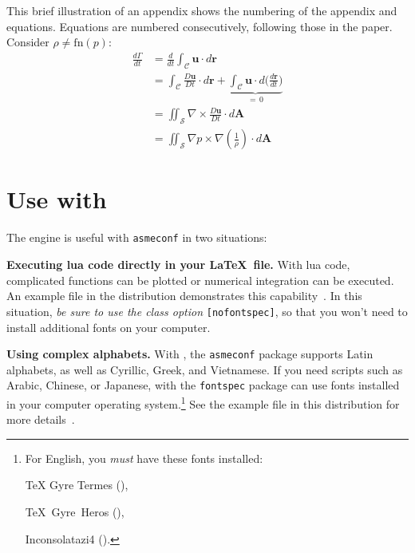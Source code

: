 \documentclass[captionpatch,colorlinks,upint,subscriptcorrection,varvw,german]{asmeconf}
\begin{document}
This brief illustration of an appendix shows the numbering of the appendix and equations. Equations are numbered
consecutively, following those in the paper. Consider $\rho \neq \textrm{fn}(p)$:
\begin{align}
\frac{d\Gamma}{dt} &{}= \frac{d}{dt} \int_{\mathcal{C}} \mathbf{u} \cdot d\mathbf{r}\\
				   &{}= \int_{\mathcal{C}} \frac{D\mathbf{u}}{Dt} \cdot d\mathbf{r} + \underbrace{\int_{\mathcal{C}} \mathbf{u}\cdot d\biggl( \frac{d\mathbf{r}}{dt}\biggr)}_{=\, 0} \\[-2pt]
                   &{}= \iint_{\mathcal{S}} \nabla \times \frac{D\mathbf{u}}{Dt}  \cdot d\mathbf{A}\\
                   &{}= \iint_{\mathcal{S}}  \nabla p \times \nabla \left( \frac{1}{\rho}\right) \cdot d\mathbf{A}
\end{align}

\section[Use with LuaLaTeX]{Use with }\label{appendix:b}

The  engine is useful with \texttt{asmeconf} in two situations:

\begin{description}

\item \textbf{Executing lua code directly in your \LaTeX\ file.} With lua code, complicated functions can be plotted or numerical integration can be executed. An example file in the distribution demonstrates this capability~\cite{lienhard2024}. In this situation, \textit{be sure to use the class option} \texttt{[nofontspec]}, so that you won't need to install additional fonts on your computer. 

\item \textbf{Using complex alphabets.} With , the \texttt{asmeconf} package supports Latin alphabets, as well as Cyrillic, Greek, and Vietnamese. If you need scripts such as Arabic, Chinese, or Japanese,  with the \texttt{fontspec} package can use fonts installed in your computer operating system.\footnote{For English, you \textit{must} have these fonts installed:\par \parbox{\columnwidth}{\setlength{\parindent}{12pt}TeX Gyre Termes (),\par TeX~Gyre~Heros (),\par 
Inconsolatazi4 ().}} See the example file in this distribution for more details~\cite{lienhard2021}.


\end{description}
\end{document}
